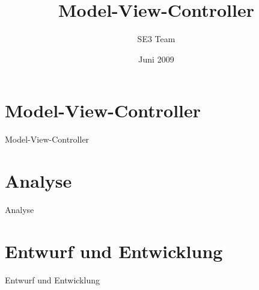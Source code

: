 \documentclass{beamer}
\title{Model-View-Controller}
\author{SE3 Team}
\date{Juni 2009}
\newcommand{\sectionframe}[1]
{
\section{#1}
\begin{frame}
    \vspace{1cm}
    \begin{center}
        \begin{LARGE}
            #1
        \end{LARGE}
    \end{center}
\end{frame}
}
\begin{document}
\frame{\titlepage}

\frame{\vspace{1cm}\tableofcontents}

\sectionframe{Model-View-Controller}



\sectionframe{Analyse}



\sectionframe{Entwurf und Entwicklung}


\end{document}
